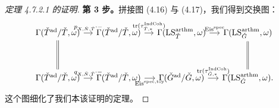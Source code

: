 \begin{proof}[定理 4.7.2.1 的证明]
\textbf{第 3 步。}拼接图 (4.16) 与 (4.17)，我们得到交换图：
\[
\begin{tikzcd}[column sep=1.1em, row sep=3.4em]
  \Gamma(\bT^{\ad}/\bT,\omega) \arrow[r, "p_{X,\bN,\bT}\cdot-"] \arrow[d, equal]
    & \Gamma(\bT^{\ad}/\bT,\omega) \arrow[r, "\tr(\tau_{\bT,*}^{\IndCoh})"]
    & \Gamma(\LS^{\arthm}_{\bT},\omega) \arrow[r, "\Eisspec"]
    & \Gamma(\LS^{\arthm}_{\bG},\omega) \arrow[d, equal]\\
  \Gamma(\bT^{\ad}/\bT,\omega) \arrow[r, "q_{X,\bN,\bT}\cdot-"]
    & \Gamma(\bT^{\ad}/\bT,\omega) \arrow[r, "\mathrm{Eis}^{\mathrm{spec},\mathrm{toy}}"']
    & \Gamma(\bG^{\ad}/\bG,\omega) \arrow[r, "\tr(\tau_{\bG,*}^{\IndCoh})"]
    & \Gamma(\LS^{\arthm}_{\bG},\omega).
\end{tikzcd}
\]
这个图细化了我们本该证明的定理。
\end{proof}

